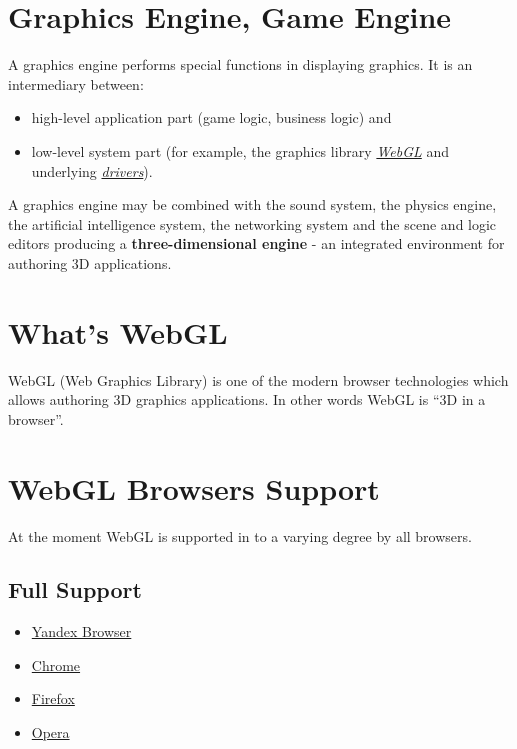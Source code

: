 \documentclass[a4paper,12pt,oneside]{sphinxmanual}
\begin{document}

\section{Graphics Engine, Game Engine}
\label{about:about-graphics-engine}\label{about:id3}\label{about:index-2}
A graphics engine performs special functions in displaying graphics. It is an intermediary between:
\begin{itemize}
\item {} 
high-level application part (game logic, business logic) and

\item {} 
low-level system part (for example, the graphics library {\hyperref[about:about-webgl]{\emph{WebGL}}} and underlying {\hyperref[about:about-drivers-video-cards]{\emph{drivers}}}).

\end{itemize}

A graphics engine may be combined with the sound system, the physics engine, the artificial intelligence system, the networking system and the scene and logic editors producing a \textbf{three-dimensional engine} - an integrated environment for authoring 3D applications.


\section{What's WebGL}
\label{about:webgl}\label{about:about-webgl}\label{about:index-3}
WebGL (Web Graphics Library) is one of the modern browser technologies which allows authoring 3D graphics applications. In other words WebGL is ``3D in a browser''.


\section{WebGL Browsers Support}
\label{about:index-4}\label{about:id4}\label{about:browser-webgl-support}
At the moment WebGL is supported in to a varying degree by all browsers.


\subsection{Full Support}
\label{about:id5}\begin{itemize}
\item {} 
\href{http://browser.yandex.ru/}{Yandex Browser}

\item {} 
\href{http://www.google.com/chrome}{Chrome}

\item {} 
\href{http://www.mozilla.org/firefox}{Firefox}

\item {} 
\href{http://www.opera.com/browser}{Opera}

\end{itemize}
\end{document}
